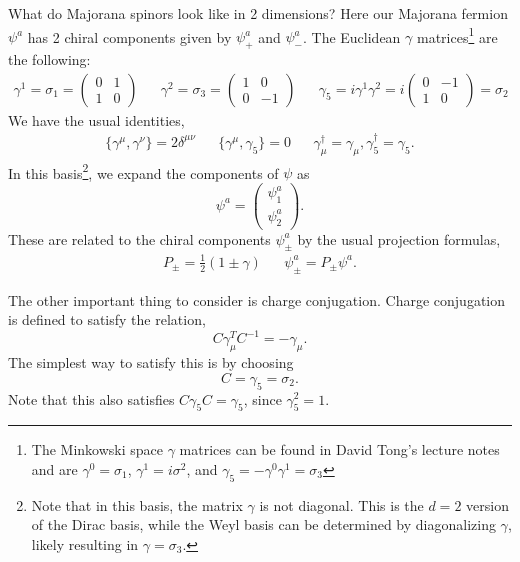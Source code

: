 What do Majorana spinors look like in 2 dimensions? Here our Majorana fermion $\psi^a$ has 2 chiral components given by $\psi_+^a$ and $\psi_-^a$. The Euclidean $\gamma$ matrices\footnote{The Minkowski space $\gamma$ matrices can be found in David Tong's lecture notes~\cite{Tong_2018} and are $\gamma^0 = \sigma_1$, $\gamma^1 = i\sigma^2$, and $\gamma_5 = -\gamma^0 \gamma^1 = \sigma_3$} are the following:
\begin{align}
	\gamma^1 = \sigma_1 = \begin{pmatrix} 0 & 1 \\ 1 & 0 \end{pmatrix} && \gamma^2 = \sigma_3 = \begin{pmatrix} 1 & 0 \\ 0 & -1 \end{pmatrix} && \gamma_5 = i\gamma^1\gamma^2 = i\begin{pmatrix} 0 & -1 \\ 1 & 0 \end{pmatrix} = \sigma_2
\end{align}
We have the usual identities,
\begin{align}
	\{\gamma^\mu, \gamma^\nu\} = 2\delta^{\mu\nu} && \{\gamma^\mu, \gamma_5\} = 0 && \gamma_\mu^\dagger = \gamma_\mu, \gamma_5^\dagger = \gamma_5.
\end{align}
In this basis\footnote{Note that in this basis, the matrix $\gamma$ is not diagonal. This is the $d=2$ version of the Dirac basis, while the Weyl basis can be determined by diagonalizing $\gamma$, likely resulting in $\gamma = \sigma_3$.}, we expand the components of $\psi$ as
\begin{equation}
	\psi^a = \begin{pmatrix} \psi_1^a \\ \psi_2^a \end{pmatrix}.
\end{equation}
These are related to the chiral components $\psi_\pm^a$ by the usual projection formulas,
\begin{align}
	P_\pm = \frac{1}{2} (1\pm \gamma) && \psi_\pm^a = P_\pm \psi^a.
\end{align}

The other important thing to consider is charge conjugation. Charge conjugation is defined to satisfy the relation,
\begin{equation}
	C \gamma_\mu^T C^{-1} = -\gamma_\mu.
\end{equation}
The simplest way to satisfy this is by choosing
\begin{equation}
	C = \gamma_5 = \sigma_2.
\end{equation}
Note that this also satisfies $C\gamma_5 C = \gamma_5$, since $\gamma_5^2 = 1$. 


